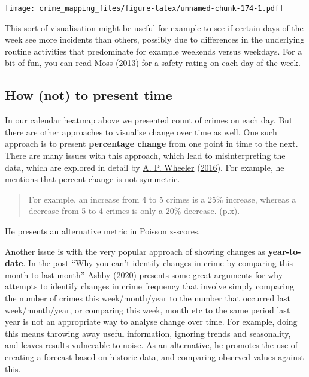 \documentclass[
  krantz2]{krantz}
\begin{document}
\texttt{[image: crime\_mapping\_files/figure-latex/unnamed-chunk-174-1.pdf]}

This sort of visualisation might be useful for example to see if certain days of the week see more incidents than others, possibly due to differences in the underlying routine activities that predominate for example weekends versus weekdays. For a bit of fun, you can read \protect\hyperlink{ref-Moss_2013}{Moss} (\protect\hyperlink{ref-Moss_2013}{2013}) for a safety rating on each day of the week.

\hypertarget{how-not-to-present-time}{%
\subsection{How (not) to present time}\label{how-not-to-present-time}}

In our calendar heatmap above we presented count of crimes on each day. But there are other approaches to visualise change over time as well. One such approach is to present \textbf{percentage change} from one point in time to the next. There are many issues with this approach, which lead to misinterpreting the data, which are explored in detail by \protect\hyperlink{ref-Wheeler_2016}{A. P. Wheeler} (\protect\hyperlink{ref-Wheeler_2016}{2016}). For example, he mentions that percent change is not symmetric.

\begin{quote}
For example, an increase from 4 to 5 crimes is a 25\% increase, whereas a decrease from 5 to 4 crimes is only a 20\% decrease. (p.x).
\end{quote}

He presents an alternative metric in Poisson z-scores.

Another issue is with the very popular approach of showing changes as \textbf{year-to-date}. In the post ``Why you can't identify changes in crime by comparing this month to last month'' \protect\hyperlink{ref-Ashby_2020}{Ashby} (\protect\hyperlink{ref-Ashby_2020}{2020}) presents some great arguments for why attempts to identify changes in crime frequency that involve simply comparing the number of crimes this week/month/year to the number that occurred last week/month/year, or comparing this week, month etc to the same period last year is not an appropriate way to analyse change over time. For example, doing this means throwing away useful information, ignoring trends and seasonality, and leaves results vulnerable to noise. As an alternative, he promotes the use of creating a forecast based on historic data, and comparing observed values against this.
\end{document}
